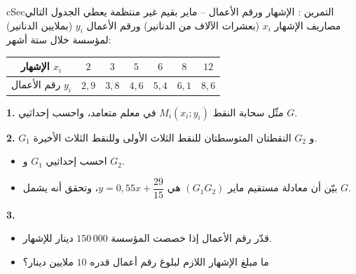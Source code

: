 \documentclass[12pt,a4paper]{article}
\newenvironment{BOX}[2]{\begin{otherlanguage}{english}\begin{arbox}{#1}{#2}}{\end{arbox}\end{otherlanguage}}
\newcounter{exo}
\newenvironment{tamrin}[1]{\stepcounter{exo}\begin{BOX}{cSec}{التمرين \theexo: #1}}{\end{BOX}}
\newenvironment{LTR}{\begin{otherlanguage}{english}}{\end{otherlanguage}}
\newcommand{\ar}[1]{\foreignlanguage{arabic}{#1}}
\newenvironment{sq}{\begin{itemize}[leftmargin=2.4em,itemsep=3pt]}{\end{itemize}}
\newcommand{\qa}{\item[(أ)]}\newcommand{\qb}{\item[(ب)]}\newcommand{\qc}{\item[(جـ)]}\newcommand{\qd}{\item[(د)]}\newcommand{\qe}{\item[(هـ)]}
\newcommand{\QQ}[1]{\par\smallskip\textbf{#1.} }
\begin{document}
\begin{tamrin}{الإشهار ورقم الأعمال -- ماير بقيم غير منتظمة}
يعطي الجدول التالي مصاريف الإشهار $x_i$ (بعشرات الآلاف من الدنانير) ورقم الأعمال $y_i$ (بملايين الدنانير) لمؤسسة خلال ستة أشهر:
\begin{center}\begin{LTR}\renewcommand{\arraystretch}{1.35}\small
\begin{tabular}{|c|c|c|c|c|c|c|}\hline
\rowcolor{cSec!12}\ar{الإشهار} $x_i$ & $2$ & $3$ & $5$ & $6$ & $8$ & $12$\\\hline
\ar{رقم الأعمال} $y_i$ & $2,9$ & $3,8$ & $4,6$ & $5,4$ & $6,1$ & $8,6$\\\hline
\end{tabular}\end{LTR}\end{center}
\QQ{1} مثّل سحابة النقط $M_i(x_i;y_i)$ في معلم متعامد، واحسب إحداثيي $G$.
\QQ{2} $G_1$ و $G_2$ النقطتان المتوسطتان للنقط الثلاث الأولى وللنقط الثلاث الأخيرة.
\begin{sq}
\qa احسب إحداثيي $G_1$ و $G_2$.
\qb بيّن أن معادلة مستقيم ماير $(G_1G_2)$ هي $y=0{,}55x+\dfrac{29}{15}$، وتحقق أنه يشمل $G$.
\end{sq}
\QQ{3}
\begin{sq}
\qa قدّر رقم الأعمال إذا خصصت المؤسسة $150\,000$ دينار للإشهار.
\qb ما مبلغ الإشهار اللازم لبلوغ رقم أعمال قدره $10$ ملايين دينار؟
\end{sq}
\end{tamrin}
\end{document}
